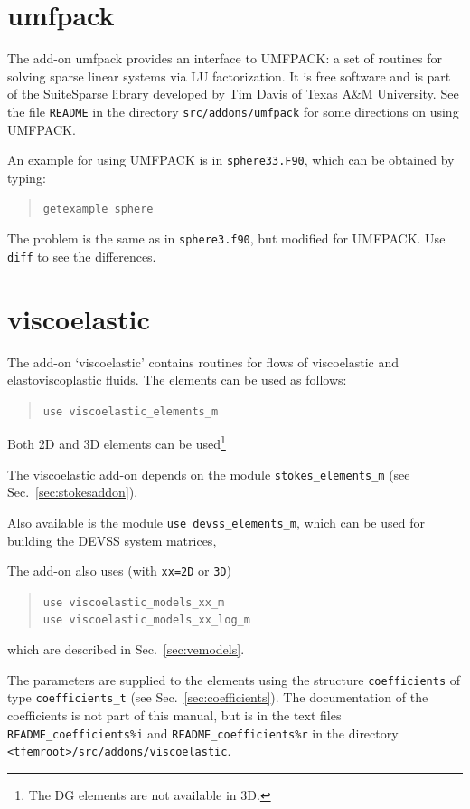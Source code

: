 \section{umfpack}
\label{sec:umfpack}

The add-on umfpack provides an interface to UMFPACK: a set of routines for solving sparse linear systems via LU factorization. It is free software and is part of the SuiteSparse library developed by Tim Davis of Texas A\&M University.
See the file \texttt{README} in the directory \texttt{src/addons/umfpack} for some
directions on using UMFPACK.

An example for using UMFPACK is in
\texttt{sphere33.F90}, which can be obtained by typing:
\begin{quote}
   \texttt{getexample sphere}
\end{quote}
The problem is
the same as in \texttt{sphere3.f90}, but modified for UMFPACK. Use
\texttt{diff} to see the differences.

\section{viscoelastic}
\label{sec:viscoelastic}

The add-on `viscoelastic' contains routines for flows of
viscoelastic and elastoviscoplastic fluids. The elements
can be used as follows:
\begin{quote}
   \texttt{use viscoelastic\_elements\_m}
\end{quote}
Both 2D and 3D elements can be used\footnote{The DG elements are
not available in 3D.}

The viscoelastic add-on depends on the module \texttt{stokes\_elements\_m}
 (see Sec.~\ref{sec:stokesaddon}).

Also available is the module
   \texttt{use devss\_elements\_m},
which can be used for building the DEVSS system matrices,

The add-on also uses (with \texttt{xx=2D} or \texttt{3D})
\begin{quote}
   \texttt{use viscoelastic\_models\_xx\_m}\\
   \texttt{use viscoelastic\_models\_xx\_log\_m}
\end{quote}
which are described in Sec.~\ref{sec:vemodels}.

The parameters are
supplied to the elements using the structure \texttt{coefficients} of type
\texttt{coefficients\_t} (see Sec.~\ref{sec:coefficients}). The documentation
of the coefficients is not part of this manual, but is in the text files
\texttt{README\_coefficients\%i} and
\texttt{README\_coefficients\%r} in the directory
\texttt{<tfemroot>/src/addons/viscoelastic}.

